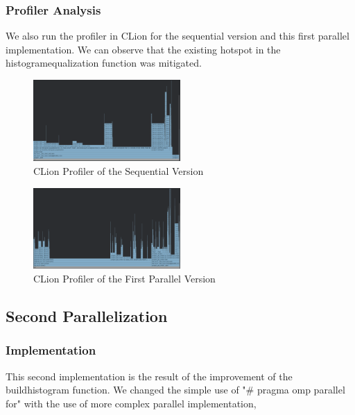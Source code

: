 \documentclass[sigconf]{acmart}
\begin{document}
\subsubsection{Profiler Analysis}
We also run the profiler in CLion for the sequential version and this first parallel implementation. We can observe that the existing hotspot in the histogram\textunderscore equalization function was mitigated. 
\begin{figure}[h]
    \centering
    \includegraphics[width=0.5\textwidth]{SequentialProfiler.png}
    \caption{CLion Profiler of the Sequential Version}
\end{figure}
\begin{figure}[h]
    \centering
    \includegraphics[width=0.5\textwidth]{InitialParallelProfiler.png}
    \caption{CLion Profiler of the First Parallel Version}
\end{figure}

\subsection{Second Parallelization}
\subsubsection{Implementation}
This second implementation is the result of the improvement of the build\textunderscore histogram function. We changed the simple use of "\# pragma omp parallel for" with the use of more complex parallel implementation, 
\end{document}
